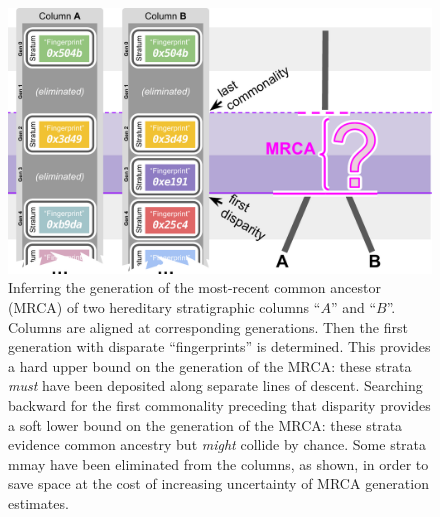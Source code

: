 \begin{figure}
    \includegraphics[width=\columnwidth]{img/column-comparison}
    \caption{
    Inferring the generation of the most-recent common ancestor (MRCA) of two hereditary stratigraphic columns ``$A$'' and ``$B$''.
    Columns are aligned at corresponding generations.
    Then the first generation with disparate ``fingerprints'' is determined.
    This provides a hard upper bound on the generation of the MRCA: these strata \textit{must} have been deposited along separate lines of descent.
    Searching backward for the first commonality preceding that disparity provides a soft lower bound on the generation of the MRCA: these strata evidence common ancestry but \textit{might} collide by chance.
    Some strata mmay have been eliminated from the columns, as shown, in order to save space at the cost of increasing uncertainty of MRCA generation estimates.
    }
  \label{fig:column-comparison}
\end{figure}
